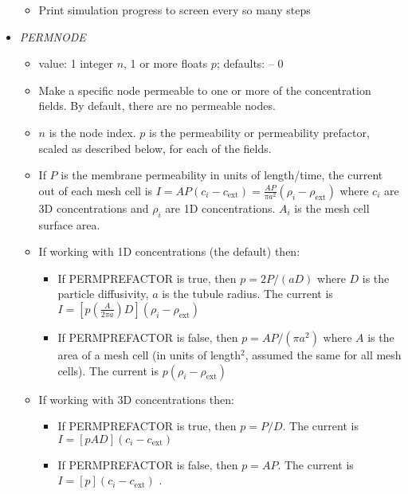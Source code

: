 \documentclass[12pt]{article}
\begin{document}
\begin{itemize}
\begin{itemize}
	\item Print simulation progress to screen every so many steps
\end{itemize}
%
\item {\it PERMNODE}
\begin{itemize}
	\item  value: 1 integer $n$, 1 or more floats $p$; defaults: -- 0
	\item Make a specific node permeable to one or more of the concentration fields. By default, there are no permeable nodes.	
	\item $n$ is the node index. $p$ is the permeability or permeability prefactor, scaled as described below, for each of the fields.
	\item If $P$ is the membrane permeability in units of length/time, the current out of each mesh cell is $I = AP (c_i - c_\text{ext}) = \frac{AP}{\pi a^2} (\rho_i - \rho_\text{ext})$ where $c_i$ are 3D concentrations and $\rho_i$ are 1D concentrations. $A_i$ is the mesh cell surface area.
	\item If working with 1D concentrations (the default) then:
	\begin{itemize}
	\item If PERMPREFACTOR is true, then $p = 2P/(aD)$ where $D$ is the particle diffusivity, $a$ is the tubule radius. The current is $I = [p (\frac{A}{2\pi a}) D](\rho_i - \rho_\text{ext})$ 
	\item If PERMPREFACTOR is false, then $p = A P/(\pi a^2)$ where $A$ is the area of a mesh cell (in units of length$^2$, assumed the same for all mesh cells). The current is $p(\rho_i - \rho_\text{ext})$
	\end{itemize}
	\item If working with 3D concentrations then:
	\begin{itemize}
		\item If PERMPREFACTOR is true, then $p = P/D$. The current is $I = [p A D](c_i - c_\text{ext})$ 
		\item If PERMPREFACTOR is false, then $p = A P$. The current is $I = [p](c_i - c_\text{ext})$  .		
	\end{itemize}
	
\end{itemize}


\end{itemize}
\end{document}

